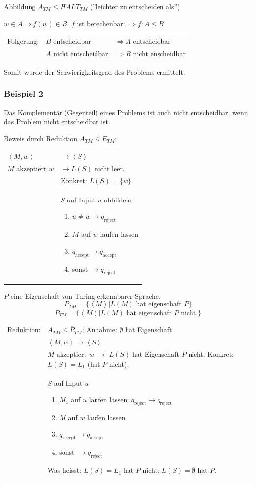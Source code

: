 Abbildung $A_{TM} \leq HALT_{TM}$ (''leichter zu entscheiden als'')

$w \in A \Rightarrow f(w) \in B$. $f$ ist berechenbar: $\Rightarrow f: A \leq B$

\begin{tabu}{l l X}
Folgerung: &$B$ entscheidbar&$\Rightarrow A$ entscheidbar \\
	&$A$ nicht entscheidbar &$\Rightarrow B$ nicht enscheidbar
\end{tabu}

Somit wurde der Schwierigkeitsgrad des Problems ermittelt.

\subsubsection{Beispiel 2}

Das Komplementär (Gegenteil) eines Problems ist auch nicht entscheidbar, wenn das Problem nicht entscheidbar ist.

Beweis durch Reduktion $A_{TM} \leq \overline{E}_{TM}$:

\begin{tabu}{l X}
	$\left<M,w\right> $ &$\rightarrow \left<S\right>$ \\
	$M$ akzeptiert $w$ &$\rightarrow L(S) $ nicht leer. \\
	& Konkret: $L(S) = \{w\}$ \\
	& $S$ auf Input $u$ abbilden: \begin{enumerate}
		\item $u \neq w \rightarrow q_\text{reject}$
		\item $M$ auf $w$ laufen lassen
		\item $q_\text{accept} \rightarrow q_\text{accept}$
		\item sonst $ \rightarrow q_\text{reject}$
		\end{enumerate}
\end{tabu}

$P$ eine Eigenschaft von Turing erkennbarer Sprache.
\[
P_{TM} = \{\left<M\right> | L(M) \text{ hat eigenschaft } P \}
\]
\[
\overline{P}_{TM} = \{\left<M\right> | L(M) \text{ hat eigenschaft } P \text{ nicht.}\}
\]

\begin{tabu}{l X}
	Reduktion: &$A_{TM} \leq \overline{P}_{TM}$; Annahme: $\emptyset$ hat Eigenschaft.\\
	& $\left<M,w\right> \rightarrow \left<S\right>$ \\
	& $M$ akzeptiert $w$ $\rightarrow$ $L(S)$ hat Eigenschaft $P$ nicht. Konkret: $L(S) = L_1$ (hat $P$ nicht).\\
	& $S$ auf Input $u$ \begin{enumerate}
		\item $M_1$ auf $u$ laufen lassen: $q_\text{reject} \rightarrow q_\text{reject}$
		\item $M$ auf $w$ laufen lassen
		\item $q_\text{accept} \rightarrow q_\text{accept}$
		\item sonst $\rightarrow q_\text{reject}$
	\end{enumerate}
	Was heisst: $L(S) = L_1$ hat $P$ nicht; $L(S) = \emptyset$ hat $P$.
\end{tabu}


